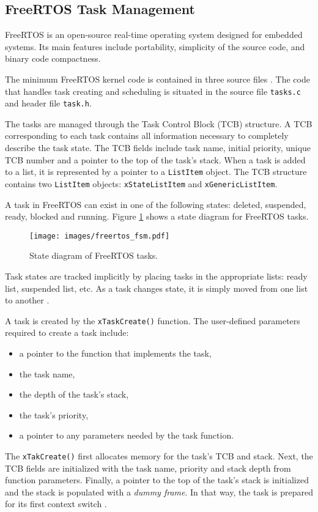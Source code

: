 \subsection{FreeRTOS Task Management}
FreeRTOS is an open-source real-time operating system designed for embedded systems. 
Its main features include portability, simplicity of the source code, and binary code compactness. 

The minimum FreeRTOS kernel code is contained in three source files \cite{brown2012architecture}. 
The code that handles task creating and scheduling is situated in the source file \verb$tasks.c$ and header file \verb$task.h$.

The tasks are managed through the Task Control Block (TCB) structure. 
A TCB corresponding to each task contains all information necessary to completely describe the task state. 
The TCB fields include task name, initial priority, unique TCB number and a pointer to the top of the task's stack. 
When a task is added to a list, it is represented by a pointer to a \verb$ListItem$ object. 
The TCB structure contains two \verb$ListItem$ objects: \verb$xStateListItem$ and \verb$xGenericListItem$.

A task in FreeRTOS can exist in one of the following states: deleted, suspended, ready, blocked and running. 
Figure \ref{freertos:state} shows a state diagram for FreeRTOS tasks. 

\begin{figure}[ht]
    \centering
    \texttt{[image: images/freertos\_fsm.pdf]}
    \caption{State diagram of FreeRTOS tasks.}
    \label{freertos:state}
\end{figure}

Task states are tracked implicitly by placing tasks in the appropriate lists: ready list, suspended list, etc. As a task changes state, it is simply moved from one list to another 
\cite{brown2012architecture}.

A task is created by the \verb$xTaskCreate()$ function. 
The user-defined parameters required to create a task include: 
\begin{itemize}
	\item a pointer to the function that implements the task,
	\item the task name,
	\item the depth of the task's stack,
	\item the task's priority,
	\item a pointer to any parameters needed by the task function.
\end{itemize}
The \verb$xTakCreate()$ first allocates memory for the task's TCB and stack.
Next, the TCB fields are initialized with the task name, priority and stack depth from function parameters. 
Finally, a pointer to the top of the task's stack is initialized and the stack is populated with a \textit{dummy frame}. 
In that way, the task is prepared for its first context switch \cite{goyette2007analysis}.

